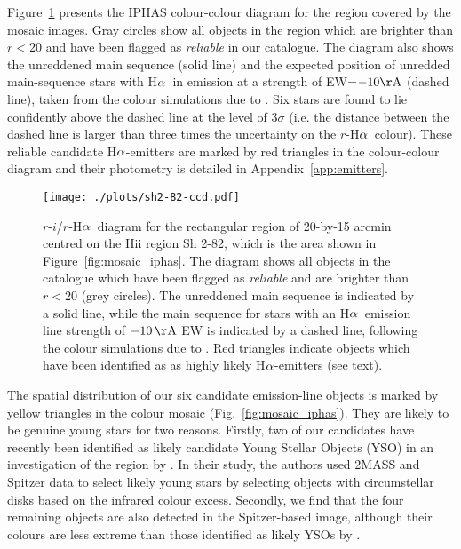 \documentclass[useAMS,usenatbib]{mn2e}
\def\ha{\mbox{H$\rm \alpha$}}
\begin{document}
Figure~\ref{fig:emitters} presents
the IPHAS colour-colour diagram for the region covered by the
mosaic images.
Gray circles show all objects in the region
which are brighter than $r<20$
and have been flagged as \emph{reliable}
in our catalogue.
The diagram also shows the unreddened main sequence (solid line)
and the expected position of unredded main-sequence stars
with \ha\ in emission at a strength of EW=$-10{\rm \AA}$ (dashed line),
taken from the colour simulations due to \citet{Barentsen2011a}.
Six stars are found to lie confidently above the 
dashed line at the level of $3\sigma$ 
(i.e. the distance between the dashed line is larger than
three times the uncertainty on the $r$-\ha\ colour).
These reliable candidate \ha-emitters
are marked by red triangles in the colour-colour diagram
and their photometry is detailed in Appendix~\ref{app:emitters}.

\begin{figure}
  \texttt{[image: ./plots/sh2-82-ccd.pdf]}
    \caption{$r$-$i$/$r$-\ha\ diagram for the rectangular region of 
    20-by-15 arcmin centred on the H{\sc ii} region Sh 2-82,
    which is the area shown in Figure~\ref{fig:mosaic_iphas}.    
    The diagram shows all objects in the catalogue
    which have been flagged as \emph{reliable} and are brighter
    than $r<20$ (grey circles).
    The unreddened main sequence is indicated by a solid line,
    while the main sequence for stars with an \ha\ emission line
    strength of $-10\,\rm{\AA}$ EW is indicated by a dashed line,
    following the colour simulations due to \citet{Barentsen2011a}.
    Red triangles indicate objects which have been identified as
    as highly likely \ha-emitters (see text).}
    \label{fig:emitters}
\end{figure}

The spatial distribution of our six candidate emission-line objects
is marked by yellow triangles in the colour mosaic (Fig.~\ref{fig:mosaic_iphas}).
They are likely to be genuine young stars for two reasons.
Firstly, two of our candidates have recently been identified as likely
candidate Young Stellar Objects (YSO)
in an investigation of the region by \cite{Yu2012}.
In their study, the authors used 2MASS and Spitzer data
to select likely young stars by selecting objects with
circumstellar disks based on the infrared colour excess.
Secondly, we find that the four remaining objects are 
also detected in the Spitzer-based image,
although their colours are less extreme
than those identified as likely YSOs by \citeauthor{Yu2012}.
\end{document}
